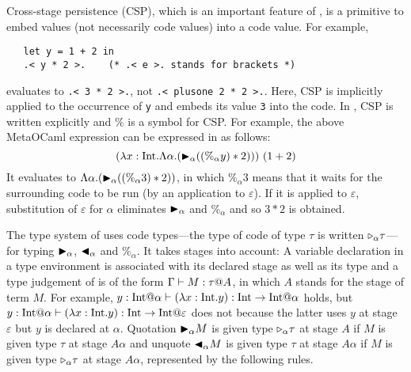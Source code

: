 Cross-stage persistence (CSP), which is an important feature of \LTP,
is a primitive to embed values (not necessarily code values) into a
code value.
For example,
\begin{verbatim}
   let y = 1 + 2 in
   .< y * 2 >.    (* .< e >. stands for brackets *)
\end{verbatim}
evaluates to \verb|.< 3 * 2 >.|, not \verb|.< plusone 2 * 2 >.|.
Here, CSP is implicitly applied to the occurrence of \texttt{y}
and embeds its value \texttt{3} into the code.
In \LTP, CSP is written explicitly and $\%$ is a symbol for CSP.
For example, the above MetaOCaml expression can be expressed
in \LTP as follows:
\[
  (\lambda x:\textrm{Int}.\Lambda\alpha.({\mathop{\blacktriangleright}}_\alpha ((\%_\alpha y) * 2)))\ (1 + 2)
\]
It evaluates to \(\Lambda\alpha.({\mathop{\blacktriangleright}}_\alpha ((\%_\alpha 3) * 2))\), in
which $\%_\alpha 3$ means that it waits for the surrounding code to be
run (by an application to $\varepsilon$).  If it is applied to
\(\varepsilon\), substitution of \(\varepsilon\) for \(\alpha\)
eliminates \({\mathop{\blacktriangleright}}_\alpha\) and \(\%_\alpha\) and so \(3 * 2\) is
obtained.

The type system of \LTP uses code types---the type of code of type
\(\tau\) is written \({\mathop{\triangleright}}_\alpha \tau\)---for typing \({\mathop{\blacktriangleright}}_\alpha\),
\({\mathop{\blacktriangleleft}}_\alpha\) and \(\%_\alpha\).  It takes stages into account: A
variable declaration in a type environment is associated with its
declared stage as well as its type and a type judgement of \LTP is of
the form $\Gamma \vdash M : \tau @ A$, in which $A$ stands for the stage
of term $M$.  For example,
$y:\I@\alpha \vdash (\lambda x:\I.y) : \I \to \I @ \alpha$ holds, but
$y:\I@\alpha \vdash (\lambda x:\I.y) : \I \to \I @ \varepsilon$ does
not because the latter uses $y$ at stage \(\varepsilon\) but $y$ is
declared at $\alpha$.  Quotation \({\mathop{\blacktriangleright}}_\alpha M\) is given type
\({\mathop{\triangleright}}_\alpha \tau\) at stage \(A\) if \(M\) is given type \(\tau\) at
stage \(A\alpha\) and  unquote \({\mathop{\blacktriangleleft}}_\alpha M\) is given type
\(\tau\) at stage \(A\alpha\) if \(M\) is given type \({\mathop{\triangleright}}_\alpha \tau\) at
stage \(A\alpha\), represented by the following rules.
\begin{center}
	 \andalso
\end{center}

